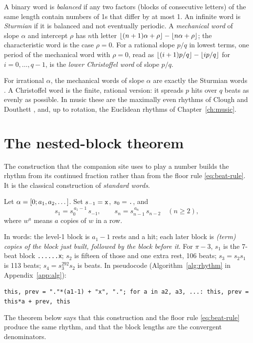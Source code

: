 \begin{definition}
A binary word is \emph{balanced} if any two factors (blocks of consecutive letters) of the same length contain numbers of 1s that differ by at most 1. An infinite word is \emph{Sturmian} if it is balanced and not eventually periodic. A \emph{mechanical word} of slope $\alpha$ and intercept $\rho$ has $n$th letter $\left\lfloor (n+1)\alpha + \rho\right\rfloor - \left\lfloor n\alpha + \rho\right\rfloor$; the characteristic word is the case $\rho = 0$. For a rational slope $p/q$ in lowest terms, one period of the mechanical word with $\rho = 0$, read as $\left\lfloor (i+1)p/q\right\rfloor - \left\lfloor ip/q\right\rfloor$ for $i = 0, \dots, q-1$, is the \emph{lower Christoffel word} of slope $p/q$.
\end{definition}

For irrational $\alpha$, the mechanical words of slope $\alpha$ are exactly the Sturmian words \citep[Ch.~2]{Lothaire2002}. A Christoffel word is the finite, rational version: it spreads $p$ hits over $q$ beats as evenly as possible. In music these are the maximally even rhythms of Clough and Douthett \citep{CloughDouthett1991}, and, up to rotation, the Euclidean rhythms of Chapter~\ref{ch:music}.

\section{The nested-block theorem}

The construction that the companion site uses to play a number builds the rhythm from its continued fraction rather than from the floor rule \eqref{eq:beat-rule}. It is the classical construction of \emph{standard words}.

\begin{definition}
Let $\alpha = [0; a_1, a_2, \dots]$. Set $s_{-1} = \texttt{x}$, $s_0 = \texttt{.}$, and
\begin{equation}\label{eq:standard}
  s_1 = s_0^{\,a_1 - 1}\, s_{-1}, \qquad s_{n} = s_{n-1}^{\,a_n}\, s_{n-2} \quad (n \ge 2),
\end{equation}
where $w^a$ means $a$ copies of $w$ in a row.
\end{definition}

In words: the level-1 block is $a_1 - 1$ rests and a hit; each later block is \emph{(term) copies of the block just built, followed by the block before it}. For $\pi - 3$, $s_1$ is the 7-beat block \texttt{......x}; $s_2$ is fifteen of those and one extra rest, 106 beats; $s_3 = s_2 s_1$ is 113 beats; $s_4 = s_3^{292} s_2$ is \BlockEnd{} beats. In pseudocode (Algorithm~\ref{alg:rhythm} in Appendix~\ref{app:alg}):
\begin{center}
\texttt{this, prev = "."*(a1-1) + "x", "."; for a in a2, a3, ...: this, prev = this*a + prev, this}
\end{center}
The theorem below says that this construction and the floor rule \eqref{eq:beat-rule} produce the same rhythm, and that the block lengths are the convergent denominators.

